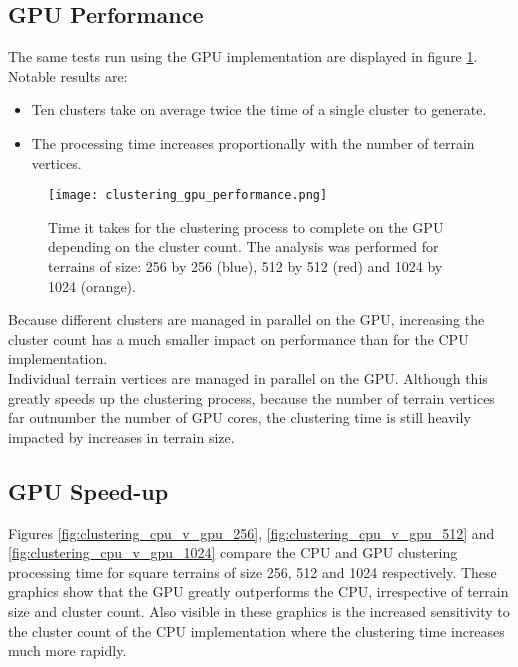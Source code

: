 \subsection{GPU Performance}

The same tests run using the GPU implementation are displayed in figure \ref{fig:gpu_clustering_performance}. Notable results are:

\begin{itemize}
\item Ten clusters take on average twice the time of a single cluster to generate.
\item The processing time increases proportionally with the number of terrain vertices.
\end{itemize}

\begin{figure}
\center
	\texttt{[image: clustering\_gpu\_performance.png]}
	\caption{ Time it takes for the clustering process to complete on the GPU depending on the cluster count. The analysis was performed for terrains of size: 256 by 256 (blue), 512 by 512 (red) and 1024 by 1024 (orange).}	
	\label{fig:gpu_clustering_performance}
\end{figure}

Because different clusters are managed in parallel on the GPU, increasing the cluster count has a much smaller impact on performance than for the CPU implementation.\\

Individual terrain vertices are managed in parallel on the GPU. Although this greatly speeds up the clustering process, because the number of terrain vertices far outnumber the number of GPU cores, the clustering time is still heavily impacted by increases in terrain size.


\subsection{GPU Speed-up}

Figures \ref{fig:clustering_cpu_v_gpu_256}, \ref{fig:clustering_cpu_v_gpu_512} and \ref{fig:clustering_cpu_v_gpu_1024} compare the CPU and GPU clustering processing time for square terrains of size 256, 512 and 1024 respectively. These graphics show that the GPU greatly outperforms the CPU, irrespective of terrain size and cluster count. Also visible in these graphics is the increased sensitivity to the cluster count of the CPU implementation where the clustering time increases much more rapidly. \\

